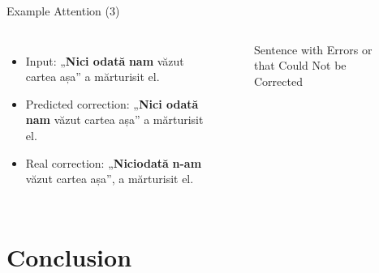 \documentclass[]{beamer}
\begin{document}
        \begin{frame}{Example Attention (3)}
            
            \begin{columns}
                    \begin{itemize}
                        \item Input: „\textbf{Nici odată} \textbf{nam} văzut cartea așa” a mărturisit el.
                        \item Predicted correction: „\textbf{Nici odată} \textbf{nam} văzut cartea așa” a mărturisit el.
                        \item Real correction: „\textbf{Niciodată} \textbf{n-am} văzut cartea așa”, a mărturisit el.
                    \end{itemize}
                    \begin{figure}[htbp]
                        \centering
                        \caption{Sentence with Errors or that Could Not be Corrected}
                        \label{fig:attention-examples-3}
                    \end{figure}
            \end{columns}
        
        \end{frame}
        
    \section{Conclusion}
        
\end{document}
